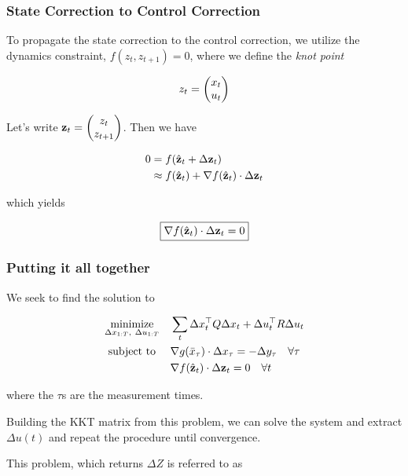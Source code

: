 \documentclass{article}
\begin{document}
\newpage
\subsubsection*{State Correction to Control Correction}

To propagate the state correction to the control correction, we utilize the dynamics constraint, $f(z_t, z_{t+1}) = 0$, where we define the \textit{knot point} 

$$
z_t =\mqty(x_t \\ u_t)
$$


Let's write $\vb{z}_t = \mqty(z_t \\ z_{t+1})$. Then we have

\begin{align*}
0 &= f( \hat{\vb{z}}_t + \Delta {\vb{z}}_t) \\
&\approx f(\hat{\vb{z}}_t) + \nabla f(\hat{\vb{z}}_t) \cdot \Delta {\vb{z}}_t \\
\end{align*}


which yields

\begin{equation}
  \boxed{
  \nabla f(\hat{\vb{z}}_t) \cdot \Delta {\vb{z}}_t = 0
  }
\end{equation}


\subsubsection*{Putting it all together}

We seek to find the solution to

\begin{align*}
  \underset{\Delta x_{1:T},\ \Delta u_{1:T}}{\text{minimize}} & \quad \sum_t \Delta x^\top_t Q \Delta x_t + \Delta u^\top_t R \Delta u_t \\
  \text{subject to} \ & \quad \nabla g(\bar x_\tau) \cdot \Delta x_\tau = - \Delta y_\tau \quad \forall \tau \\
  & \quad \nabla f(\hat{\vb{z}}_t) \cdot \Delta {\vb{z}}_t = 0 \quad \forall t
\end{align*}


where the $\tau$s are the measurement times.

\hfill


Building the KKT matrix from this problem, we can solve the system and extract $\Delta u(t)$ and repeat the procedure until convergence.

\hfill

This problem, which returns $\Delta Z$ is referred to as 
\end{document}
